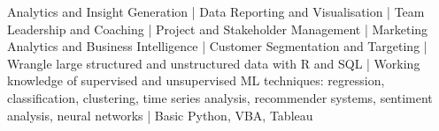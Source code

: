 

\begin{cvparagraph}

Analytics and Insight Generation | Data Reporting and Visualisation | Team Leadership and Coaching | Project and Stakeholder Management | Marketing Analytics and Business Intelligence | Customer Segmentation and Targeting | Wrangle large structured and unstructured data with R and SQL | Working knowledge of supervised and unsupervised ML techniques: regression, classification, clustering, time series analysis, recommender systems, sentiment analysis, neural networks | Basic Python, VBA, Tableau
\end{cvparagraph}

